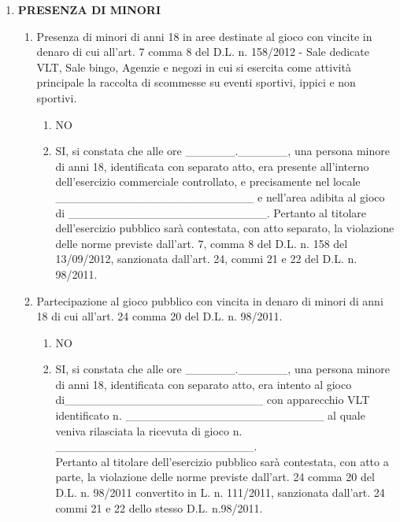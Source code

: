 \documentclass[12pt]{article}
\begin{document}
\begin{enumerate}[label={}]
        \item \textbf{PRESENZA DI MINORI}
        \begin{enumerate}
            \item Presenza di minori di anni 18 in aree destinate al gioco con vincite in denaro di cui all’art. 7 comma 8 del D.L. n. 158/2012  - Sale dedicate VLT, Sale bingo, Agenzie e negozi in cui si esercita come attività principale la raccolta di scommesse su eventi sportivi, ippici e non sportivi.
            \begin{enumerate}[label={\begin{math}\square\end{math}}]
                \item NO
                \item SI, si constata che alle ore \_\_\_\_\_\_.\_\_\_\_\_\_, una persona minore di anni 18, identificata con separato atto, era presente all'interno dell'esercizio commerciale controllato, e precisamente nel locale \_\_\_\_\_\_\_\_\_\_\_\_\_\_\_\_\_\_\_\_\_\_\_\_ e nell'area adibita al gioco di \_\_\_\_\_\_\_\_\_\_\_\_\_\_\_\_\_\_\_\_\_\_\_\_. Pertanto al titolare dell’esercizio pubblico sarà contestata, con atto separato, la violazione delle norme previste dall’art. 7, comma 8 del D.L. n. 158 del 13/09/2012, sanzionata dall’art. 24, commi 21 e 22 del D.L. n. 98/2011.
            \end{enumerate}
            \item Partecipazione al gioco pubblico con vincita in denaro di minori di anni 18 di cui all’art. 24 comma 20 del D.L. n. 98/2011.
            \begin{enumerate}[label={\begin{math}\square\end{math}}]
                \item NO
                \item SI, si constata che alle ore \_\_\_\_\_\_.\_\_\_\_\_\_, una persona minore di anni 18, identificata con separato atto, era intento al gioco di\_\_\_\_\_\_\_\_\_\_\_\_\_\_\_\_\_\_\_\_\_\_\_\_
                con apparecchio VLT identificato n. \_\_\_\_\_\_\_\_\_\_\_\_\_\_\_\_\_\_\_\_\_\_\_\_
                al quale veniva rilasciata la ricevuta di gioco n. \_\_\_\_\_\_\_\_\_\_\_\_\_\_\_\_\_\_\_\_\_\_\_\_.
                \\Pertanto al titolare dell’esercizio pubblico sarà contestata, con atto a parte, la violazione delle norme previste dall’art. 24 comma 20 del D.L. n. 98/2011 convertito in L. n. 111/2011, sanzionata dall’art. 24 commi 21 e 22 dello stesso D.L. n.98/2011.
            \end{enumerate}

        \end{enumerate}

\end{enumerate}
\end{document}
